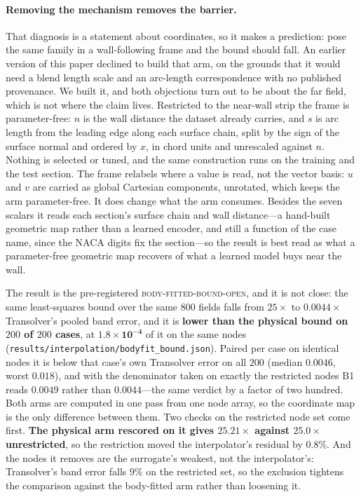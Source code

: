 \paragraph{Removing the mechanism removes the barrier.} That diagnosis is a statement about
coordinates, so it makes a prediction: pose the same family in a wall-following frame and
the bound should fall. An earlier version of this paper declined to build that arm, on the
grounds that it would need a blend length scale and an arc-length correspondence with no
published provenance. We built it, and both objections turn out to be about the far field,
which is not where the claim lives. Restricted to the near-wall strip the frame is
parameter-free: $n$ is the wall distance the dataset already carries, and $s$ is arc length
from the leading edge along each surface chain, split by the sign of the surface normal and
ordered by $x$, in chord units and unrescaled against $n$. Nothing is selected or tuned, and
the same construction runs on the training and the test section. The frame relabels where a
value is read, not the vector basis: $u$ and $v$ are carried as global Cartesian
components, unrotated, which keeps the arm parameter-free. It does change what the arm
consumes. Besides the seven scalars it reads each section's surface chain and wall
distance---a hand-built geometric map rather than a learned encoder, and still a function
of the case name, since the NACA digits fix the section---so the result is best read as
what a parameter-free geometric map recovers of what a learned model buys near the wall.

The result is the pre-registered \textsc{body-fitted-bound-open}, and it is not close:
the same least-squares bound over the same $800$ fields falls from $25\times$ to
$\mathbf{0.0044\times}$ Transolver's pooled band error, and it is \textbf{lower than the
physical bound on $200$ of $200$ cases}, at $\mathbf{1.8\times10^{-4}}$ of it on the same
nodes (\texttt{results\slash{}interpolation\slash{}bodyfit\_bound.json}). Paired per case on identical
nodes it is below that case's own Transolver error on all $200$ (median $0.0046$, worst
$0.018$), and with the denominator taken on exactly the restricted nodes B1 reads $0.0049$
rather than $0.0044$---the same verdict by a factor of two hundred. Both arms are computed
in one pass from one node array, so the coordinate map is the only difference between
them. Two checks on the restricted node set come first. \textbf{The physical arm rescored on
it gives $25.21\times$ against $25.0\times$ unrestricted}, so the restriction moved the
interpolator's residual by $0.8\%$. And the nodes it removes are the surrogate's weakest,
not the interpolator's: Transolver's band error falls $9\%$ on the restricted set, so the
exclusion tightens the comparison against the body-fitted arm rather than loosening it.


